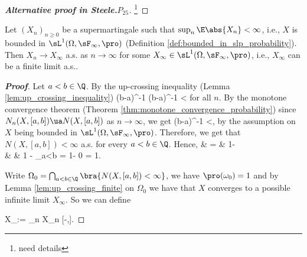 \begin{proof}[\bf Alternative proof in Steele\cite{Steele_2001}.$P_{25}$]
\footnote{need details}
\end{proof}


\begin{theorem}\label{thm:martingale_convergence_discrete}
Let $(X_n)_{n \geq 0}$ be a supermartingale such that $\sup_n \E\abs{X_n} <\infty$, i.e., $X$ is bounded in $\sL^1(\Omega,\sF_\infty,\pro)$ (Definition \ref{def:bounded_in_slp_probability}). Then $X_n \to X_\infty$ a.s. as
$n\to \infty$ for some $X_\infty\in \sL^1(\Omega,\sF_\infty,\pro)$, i.e., $X_\infty$ can be a finite limit a.s..
\end{theorem}

\begin{proof}[\bf Proof]
Let $a < b \in \Q$. By the up-crossing inequality (Lemma \ref{lem:up_crossing_inequality})
\be
\E{} \leq (b-a)^{-1}\E{} \leq (b-a)^{-1} <\infty
\ee
for all $n$. By the monotone convergence theorem (Theorem \ref{thm:monotone_convergence_probability}) since $N_n(X,[a,b])\ua N(X,[a,b])$ as $n\to \infty$, we get \be \E{} \ua \E{} \leq
(b-a)^{-1}  <\infty, \ee by the assumption on $X$ being bounded in $\sL^1(\Omega,\sF_\infty,\pro)$. Therefore, we get that $N(X,[a,b]) < \infty$ a.s. for every $a < b \in \Q$. Hence, \beast
\pro{} & = & 1- \pro{} \\
& \geq & 1 - \sum_{a<b\in \Q}\pro{} =  1- 0 = 1.
\eeast

Write $\Omega_0 = \bigcap_{a<b\in \Q}\bra{N(X,[a,b])< \infty}$, we have $\pro(\omega_0)  =1$ and by Lemma \ref{lem:up_crossing_finite} on $\Omega_0$ we have that $X$ converges to a possible infinite limit $X_\infty$. So we
can define


\be X_\infty := \lim_{n\to\infty} X_n \quad {}[-\infty,\infty]. \ee



\end{proof}
